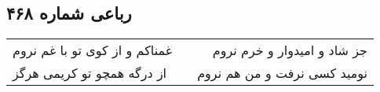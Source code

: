 \begin{center}
\section*{رباعی شماره ۴۶۸}
\label{sec:sh468}
\begin{longtable}{l p{0.5cm} r}
غمناکم و از کوی تو با غم نروم
&&
جز شاد و امیدوار و خرم نروم
\\
از درگه همچو تو کریمی هرگز
&&
نومید کسی نرفت و من هم نروم
\\
\end{longtable}
\end{center}
